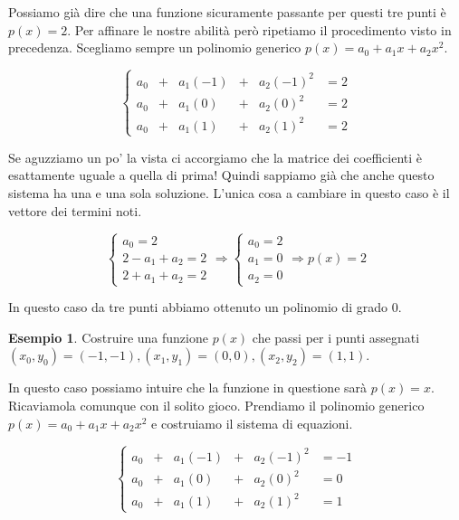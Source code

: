 \documentclass{article}
\theoremstyle{plain}
\theoremstyle{plain}
\theoremstyle{definition}
\theoremstyle{definition}
\newtheorem{esempio}{Esempio}
\begin{document}
Possiamo già dire che una funzione sicuramente passante per questi tre punti è $p(x)=2$. Per affinare le nostre abilità però ripetiamo il procedimento visto in precedenza. Scegliamo sempre un polinomio generico $p(x)=a_{0}+a_{1}x+a_{2}x^2$.

\begin{equation*}
	\left\{
	\begin{alignedat}{3}
		a_{0} & +{} &  a_{1}(-1) & +{} & a_{2}(-1)^2 & = 2 \\
		a_{0} & +{} &  a_{1}(0) & +{} &  a_{2}(0)^2 & = 2 \\
		a_{0} & +{} & a_{1}(1) & +{} & a_{2}(1)^2 & = 2
	\end{alignedat}
	\right.
\end{equation*}

Se aguzziamo un po' la vista ci accorgiamo che la matrice dei coefficienti è esattamente uguale a quella di prima! Quindi sappiamo già che anche questo sistema ha una e una sola soluzione. L'unica cosa a cambiare in questo caso è il vettore dei termini noti.

\[
\begin{cases}
	a_{0} = 2 \\
	2-a_{1}+a_{2} = 2 \\
	2+a_{1}+a_{2} = 2
\end{cases}
\Rightarrow
\begin{cases}
	a_{0} = 2 \\
	a_{1} = 0 \\
	a_{2} = 0
\end{cases}
\Rightarrow
p(x)=2
\]

In questo caso da tre punti abbiamo ottenuto un polinomio di grado 0.

\begin{esempio}
	Costruire una funzione $p(x)$ che passi per i punti assegnati $(x_0, y_0)=(-1,-1), (x_1, y_1)=(0,0), (x_2, y_2)=(1,1)$.
\end{esempio}

In questo caso possiamo intuire che la funzione in questione sarà $p(x)=x$. Ricaviamola comunque con il solito gioco. Prendiamo il polinomio generico $p(x)=a_{0}+a_{1}x+a_{2}x^2$ e costruiamo il sistema di equazioni.

\begin{equation*}
	\left\{
	\begin{alignedat}{3}
		a_{0} & +{} &  a_{1}(-1) & +{} & a_{2}(-1)^2 & = -1 \\
		a_{0} & +{} &  a_{1}(0) & +{} &  a_{2}(0)^2 & = 0 \\
		a_{0} & +{} & a_{1}(1) & +{} & a_{2}(1)^2 & = 1
	\end{alignedat}
	\right.
\end{equation*}
\end{document}
